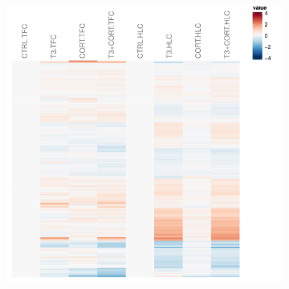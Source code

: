\begin{figure}[!htbp]
\centering
\vspace{1\baselineskip}
%
%
\begin{subfigure}{0.495\textwidth}
	\includegraphics[width=\textwidth]
	{Figures/comparison-tfc-hlc-histones/comparison-tfc-hlc-histones-all.pdf}
	\caption{}
	\label{subfig:comparison-tfc-hlc-histones-all}
\end{subfigure}
\begin{subfigure}{0.495\textwidth}

\end{subfigure}
\end{figure}

